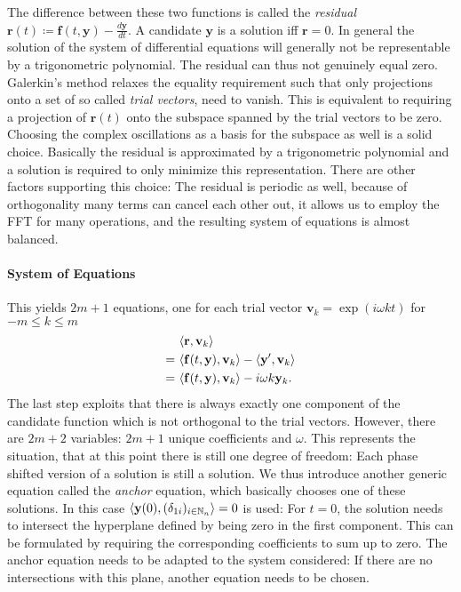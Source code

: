 The difference between these two functions is called the \emph{residual} $\mathbf{r}(t) \coloneqq \mathbf{f}(t,\mathbf{y}) - \frac{d\mathbf{y}}{dt}$.
A candidate $\mathbf y$ is a solution iff $\mathbf r = 0$.
In general the solution of the system of differential equations will generally not be representable by a trigonometric polynomial.
The residual can thus not genuinely equal zero.
Galerkin's method relaxes the equality requirement such that only projections onto a set of so called \emph{trial vectors}, need to vanish.
This is equivalent to requiring a projection of $\mathbf{r}(t)$ onto the subspace spanned by the trial vectors to be zero.
Choosing the complex oscillations as a basis for the subspace as well is a solid choice.
Basically the residual is approximated by a trigonometric polynomial and a solution is required to only minimize this representation.
There are other factors supporting this choice: The residual is periodic as well, because of orthogonality many terms can cancel each other out, it allows us to employ the FFT for many operations, and the resulting system of equations is almost balanced.

\paragraph{System of Equations} This yields $2m+1$ equations, one for each trial vector $\mathbf{v}_k = \exp\left( i \omega k t \right)$ for $-m \le k \le m$
	\begin{align*}
		& \langle \mathbf{r} , \mathbf{v}_k \rangle \\
		=\ & \langle \mathbf{f}(t,\mathbf{y}), \mathbf{v}_k \rangle - \langle \mathbf{y}^\prime, \mathbf{v}_k \rangle \\
		=\ & \langle \mathbf{f}(t,\mathbf{y}), \mathbf{v}_k \rangle - i \omega k \mathbf{y}_k \text.
	\end{align*}
The last step exploits that there is always exactly one component of the candidate function which is not orthogonal to the trial vectors.
However, there are $2m+2$ variables: $2m+1$ unique coefficients and $\omega$.
This represents the situation, that at this point there is still one degree of freedom: Each phase shifted version of a solution is still a solution.
We thus introduce another generic equation called the \emph{anchor} equation, which basically chooses one of these solutions.
In this case $\langle \mathbf{y}(0), (\delta_{1i})_{i \in \mathbb{N}_n} \rangle = 0$ is used:
For $t = 0$, the solution needs to intersect the hyperplane defined by being zero in the first component.
This can be formulated by requiring the corresponding coefficients to sum up to zero.
The anchor equation needs to be adapted to the system considered: If there are no intersections with this plane, another equation needs to be chosen.

